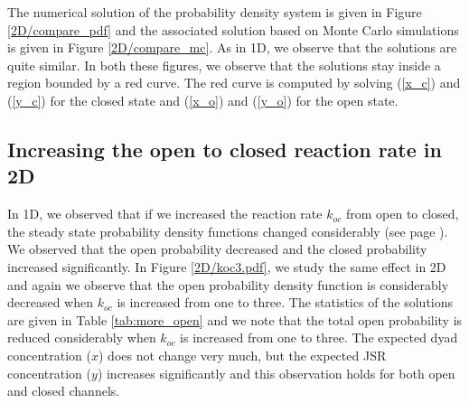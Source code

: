 The numerical solution of the probability density system is given in Figure  \ref{2D/compare_pdf}  and the associated solution based on Monte Carlo simulations is given in Figure \ref{2D/compare_mc}. As in 1D, we observe that the solutions are quite similar. In both these figures, we observe that the solutions stay inside a region bounded by a red curve. The red curve is computed by solving (\ref{x_c}) and (\ref{y_c}) for the closed state and (\ref{x_o}) and (\ref{y_o}) for the open state.





\subsection{Increasing the open to closed reaction rate in 2D}

In 1D, we observed that if we increased the reaction rate $k_{oc}$  from open to closed, the steady state probability density functions changed considerably (see page \pageref{increasingkoc}). We observed that the open probability decreased and the closed probability increased significantly. In Figure \ref{2D/koc3.pdf}, we study the same effect in 2D and again we observe that the open probability density function is considerably decreased when $k_{oc}$ is increased from one to three. The statistics of the solutions are given in Table \ref{tab:more_open} and we note that the total open probability is reduced considerably 
when $k_{oc}$ is increased from one to three. The expected dyad concentration ($x$) does not change very much, but the expected JSR concentration ($y$) increases significantly and this observation holds for both open and closed channels. 



